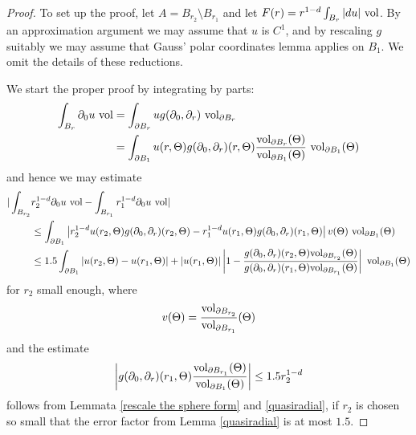 \begin{proof}
To set up the proof, let $A = B_{r_2} \setminus B_{r_1}$ and let $F(r) = r^{1 - d} \int_{B_r} |du| ~\mathrm{vol}$.
By an approximation argument we may assume that $u$ is $C^1$, and by rescaling $g$ suitably we may assume that Gauss' polar coordinates lemma applies on $B_1$.
We omit the details of these reductions.

We start the proper proof by integrating by parts:
\begin{align*}
\int_{B_r} \partial_0u ~\mathrm{vol} &= \int_{\partial B_r} ug(\partial_0, \partial_r) ~\mathrm{vol}_{\partial B_r} \\
&= \int_{\partial B_1} u(r, \Theta) g(\partial_0, \partial_r)(r, \Theta) \frac{\mathrm{vol}_{\partial B_r}(\Theta)}{\mathrm{vol}_{\partial B_1}(\Theta)} ~\mathrm{vol}_{\partial B_1}(\Theta)
\end{align*}
and hence we may estimate
\begin{align*}
|\int_{B_{r_2}} &r_2^{1 - d} \partial_0u ~\mathrm{vol} -\int_{B_{r_1}} r_1^{1 - d} \partial_0u ~\mathrm{vol}|\\
&\leq \int_{\partial B_1} \left|r_2^{1 - d}u(r_2, \Theta) g(\partial_0, \partial_r)(r_2, \Theta)
- r_1^{1 - d}u(r_1, \Theta) g(\partial_0, \partial_r)(r_1, \Theta) \right|
v(\Theta) ~\mathrm{vol}_{\partial B_1}(\Theta) \\
&\leq 1.5 \int_{\partial B_1} |u(r_2, \Theta) - u(r_1, \Theta)| + |u(r_1, \Theta)|
\left|1 - \frac{g(\partial_0, \partial_r)(r_2, \Theta) \mathrm{vol}_{\partial B_{r_2}}(\Theta)}{g(\partial_0, \partial_r)(r_1, \Theta) \mathrm{vol}_{\partial B_{r_1}}(\Theta)}\right| ~\mathrm{vol}_{\partial B_1}(\Theta)
\end{align*}
for $r_2$ small enough, where
$$v(\Theta) = \frac{\mathrm{vol}_{\partial B_{r_2}}}{\mathrm{vol}_{\partial B_{r_1}}}(\Theta)$$
and the estimate
$$\left|g(\partial_0, \partial_r)(r_1, \Theta) \frac{\mathrm{vol}_{\partial B_{r_1}}(\Theta)}{\mathrm{vol}_{\partial B_1}(\Theta)}\right| \leq 1.5 r_2^{1 - d}$$
follows from Lemmata \ref{rescale the sphere form} and \ref{quasiradial}, if $r_2$ is chosen so small that the error factor from Lemma \ref{quasiradial} is at most $1.5$.


\end{proof}
